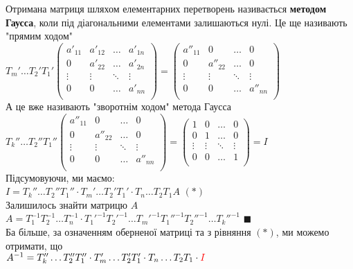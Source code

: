 \documentclass[a4paper, 14pt]{extarticle}
\def\bigline{\vspace{5mm}\\}
\def\qed{$\blacksquare$}
\begin{document}
	Отримана матриця шляхом елементарних перетворень називається \textbf{методом Гаусса}, коли під діагональними елементами залишаються нулі. Це ще називають "прямим ходом"\\
	$T_m' \dots T_2' T_1' \begin{pmatrix}
	a'_{11} & a'_{12} & \dots & a'_{1n} \\
	0 & a'_{22} & \dots & a'_{2n} \\
	\vdots & \vdots & \ddots & \vdots \\
	0 & 0 & \dots & a'_{nn} \\
	\end{pmatrix} = \begin{pmatrix}
	a''_{11} & 0 & \dots & 0 \\
	0 & a''_{22} & \dots & 0 \\
	\vdots & \vdots & \ddots & \vdots \\
	0 & 0 & \dots & a''_{nn} \\
	\end{pmatrix}$\\
	А це вже називають "зворотнім ходом" \textrm{} метода Гаусса\\
	$T_k''\dots T_2'' T_1'' \begin{pmatrix}
	a''_{11} & 0 & \dots & 0 \\
	0 & a''_{22} & \dots & 0 \\
	\vdots & \vdots & \ddots & \vdots \\
	0 & 0 & \dots & a''_{nn} \\
	\end{pmatrix} = \begin{pmatrix}
	1 & 0 & \dots & 0 \\
	0 & 1 & \dots & 0 \\
	\vdots & \vdots & \ddots & \vdots \\
	0 & 0 & \dots & 1 \\
	\end{pmatrix} = I$\\
	Підсумовуючи, ми маємо:\\
	$I = T_k'' \dots T_2'' T_1'' \cdot T_m' \dots T_2' T_1' \cdot T_n \dots T_2 T_1 A$ $(*)$\\
	Залишилось знайти матрицю $A$\\
	$A = T_1^{-1} T_2^{-1} \dots T_n^{-1} \cdot T_1'^{-1} T_2'^{-1} \dots T_m'^{-1} T_1''^{-1} T_2''^{-1} \dots T_k''^{-1}$
	\qed
	\bigline
	Ба більше, за означенням оберненої матриці та з рівняння $(*)$, ми можемо отримати, що\\
	$A^{-1} = T_k'' \dots T_2'' T_1'' \cdot T_m' \dots T_2' T_1' \cdot T_n \dots T_2 T_1 \cdot \textcolor{red}{I}$\\
\end{document}
